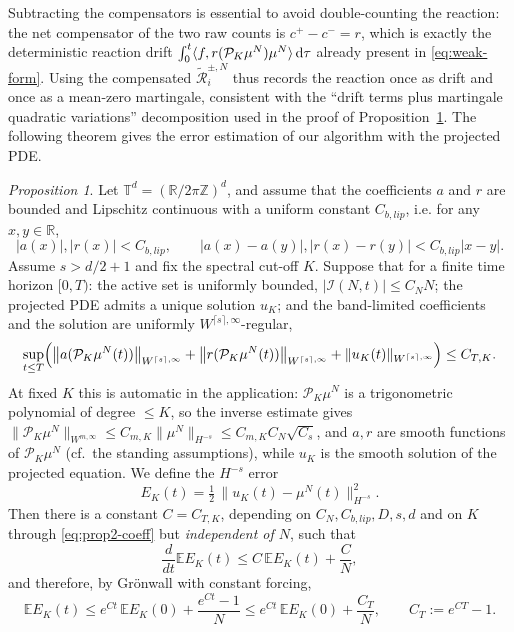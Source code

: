 \documentclass[a4paper,fleqn]{cas-sc}
\theoremstyle{definition}
\theoremstyle{remark}
\newtheorem{proposition}{Proposition}
\begin{document}
Subtracting the compensators is essential to avoid double-counting the reaction:
the net compensator of the two raw counts is $c^+-c^-=r$, which is exactly the
deterministic reaction drift
$\int_0^t\langle f,r(\mathcal P_K\mu^N)\mu^N\rangle\,\mathrm{d}\tau$ already present in
\eqref{eq:weak-form}. Using the compensated $\widetilde{\mathcal R}^{\pm,N}_i$ thus
records the reaction once as drift and once as a mean-zero martingale, consistent
with the ``drift terms plus martingale quadratic variations'' decomposition used in
the proof of Proposition~\ref{prop:u_K_mu}.
 The following theorem gives the error estimation of our algorithm with the projected PDE.
\begin{proposition}
\label{prop:u_K_mu}
Let $\mathbb{T}^d = (\mathbb{R}/2\pi\mathbb{Z})^d$, and assume that the coefficients $a$ and $r$ are bounded and Lipschitz continuous with a uniform constant $C_{b,lip}$, i.e. for any $x, y\in \mathbb R$,
    \[
    |a(x)|,|r(x)| < C_{b,lip}, \qquad |a(x)-a(y)|,|r(x)-r(y)| < C_{b,lip} |x-y|.
    \]
    Assume $s>d/2+1$ and fix the spectral cut-off $K$. Suppose that for a finite time
    horizon $[0,T)$: the active set is uniformly bounded, $|\mathcal{I}(N,t)| \le C_{N}N$;
    the projected PDE admits a unique solution $u_K$; and the band-limited coefficients
    and the solution are uniformly $W^{\lceil s\rceil,\infty}$-regular,
    \begin{equation}\label{eq:prop2-coeff}
    \sup_{t\le T}\Bigl(\bigl\|a(\mathcal P_K\mu^N(t))\bigr\|_{W^{\lceil s\rceil,\infty}}
    +\bigl\|r(\mathcal P_K\mu^N(t))\bigr\|_{W^{\lceil s\rceil,\infty}}
    +\|u_K(t)\|_{W^{\lceil s\rceil,\infty}}\Bigr)\le C_{T,K}.
    \end{equation}
    At fixed $K$ this is automatic in the application: $\mathcal P_K\mu^N$ is a
    trigonometric polynomial of degree $\le K$, so the inverse estimate gives
    $\|\mathcal P_K\mu^N\|_{W^{m,\infty}}\le C_{m,K}\|\mu^N\|_{H^{-s}}\le C_{m,K}C_N\sqrt{C_s}$,
    and $a,r$ are smooth functions of $\mathcal P_K\mu^N$ (cf.\ the standing assumptions),
    while $u_K$ is the smooth solution of the projected equation.
    We define the $H^{-s}$ error
    $$E_{K}(t) = \tfrac{1}{2}\,\|u_K(t) - \mu^N(t)\|_{H^{-s}}^2 .$$
    Then there is a constant $C=C_{T,K}$, depending on $C_N,C_{b,lip},D,s,d$ and on $K$
    through \eqref{eq:prop2-coeff} but \emph{independent of $N$}, such that
    \[
   \frac{d}{dt} \mathbb E  E_K(t) \leq 
C\,\mathbb E E_K(t) + \frac{C}{N},
    \]
    and therefore, by Gr\"onwall with constant forcing,
    \[
    \mathbb E E_K(t) \leq e^{Ct}\,\mathbb E E_K(0) + \frac{e^{Ct}-1}{N}
    \le e^{Ct}\,\mathbb E E_K(0) + \frac{C_T}{N},\qquad C_T:=e^{CT}-1.
    \]  
\end{proposition}    
\end{document}
